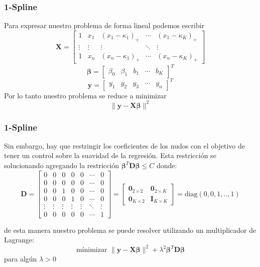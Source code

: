 \documentclass[aspectratio=169,spanish]{beamer}
\begin{document}
\begin{frame}
\frametitle{1-Spline}
Para expresar nuestro problema de forma lineal podemos escribir 
\begin{equation*}
\bm{X} = 
\begin{bmatrix}
1 & x_1 & (x_1-\kappa_1)_{+} & \cdots &(x_1-\kappa_K)_{+}\\
\vdots & \vdots & \vdots & \ddots &\vdots\\
1 & x_n & (x_n-\kappa_1)_{+} & \cdots &(x_n-\kappa_K)_{+}
\end{bmatrix}
\end{equation*}
\begin{equation*}
\bm{\beta} = 
\begin{bmatrix}
\beta_0 & \beta_1 & b_1 & \cdots & b_K
\end{bmatrix}^T
\end{equation*}
\begin{equation*}
\bm{y} = 
\begin{bmatrix}
y_1 & y_2 & y_3 & \cdots & y_n
\end{bmatrix}^T
\end{equation*}
Por lo tanto nuestro problema se reduce a minimizar $$\| \bm{y} - \bm{X\beta}\|^2$$
\end{frame}

\begin{frame}
\frametitle{1-Spline}
Sin embargo, hay que restringir los coeficientes de los nudos con el objetivo de tener un control sobre la suavidad de la regresión. Esta restricción se solucionando agregando la restricción $\bm{\beta}^T\bm{D}\bm{\beta}\le C$ donde:
\begin{equation*}
\bm{D} = 
\begin{bmatrix}
0&0&0&0&0&\cdots&0\\
0&0&0&0&0&\cdots&0\\
0&0&1&0&0&\cdots&0\\
0&0&0&1&0&\cdots&0\\
\vdots&\vdots&\vdots&\vdots&\vdots&\ddots&\vdots\\
0&0&0&0&0&\cdots&1
\end{bmatrix} = 
\begin{bmatrix}
\bm{0}_{2\times 2}&\bm{0}_{2\times K}\\
\bm{0}_{K\times 2}&\bm{I}_{K\times K}
\end{bmatrix}=\text{diag}(0,0,1,..,1)
\end{equation*}

de esta manera nuestro problema se puede resolver utilizando un multiplicador de Lagrange:
$$\text{mínimizar } \| \bm{y} - \bm{X\beta}\|^2 + \lambda^2\bm{\beta}^T\bm{D}\bm{\beta}$$ para algún $\lambda>0$
\end{frame}
\end{document}
